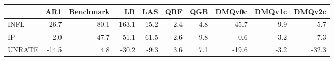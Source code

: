 \begin{tabular}{lrrrrrrrrr}
\toprule
 & AR1 & Benchmark & LR & LAS & QRF & QGB & DMQv0c & DMQv1c & DMQv2c \\
\midrule
INFL & -26.7 & -80.1 & -163.1 & -15.2 & 2.4 & -4.8 & -45.7 & -9.9 & 5.7 \\
IP & -2.0 & -47.7 & -51.1 & -61.5 & -2.6 & 9.8 & 0.6 & 3.2 & 7.3 \\
UNRATE & -14.5 & 4.8 & -30.2 & -9.3 & 3.6 & 7.1 & -19.6 & -3.2 & -32.3 \\
\bottomrule
\end{tabular}
